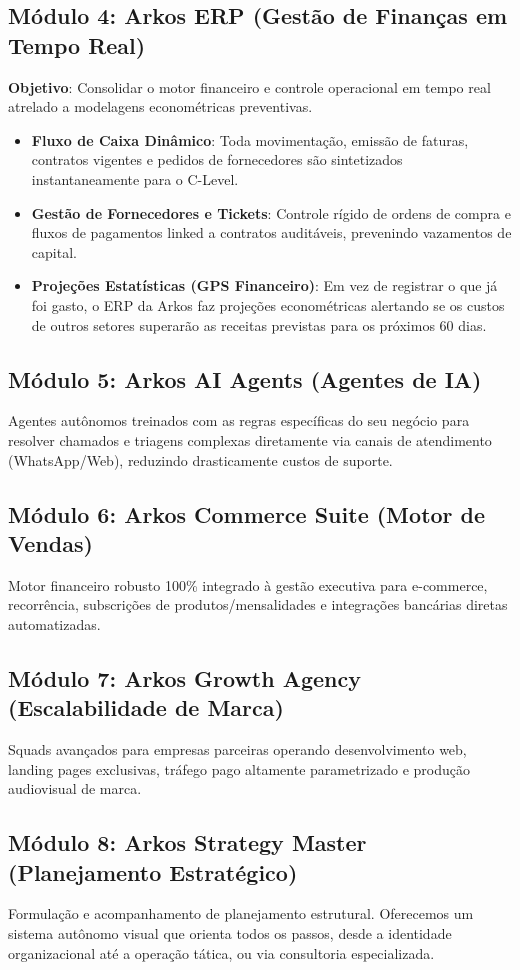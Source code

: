 \subsection{Módulo 4: Arkos ERP (Gestão de Finanças em Tempo Real)}
\textbf{Objetivo}: Consolidar o motor financeiro e controle operacional em tempo real atrelado a modelagens econométricas preventivas.
\begin{itemize}
    \item \textbf{Fluxo de Caixa Dinâmico}: Toda movimentação, emissão de faturas, contratos vigentes e pedidos de fornecedores são sintetizados instantaneamente para o C-Level.
    \item \textbf{Gestão de Fornecedores e Tickets}: Controle rígido de ordens de compra e fluxos de pagamentos linked a contratos auditáveis, prevenindo vazamentos de capital.
    \item \textbf{Projeções Estatísticas (GPS Financeiro)}: Em vez de registrar o que já foi gasto, o ERP da Arkos faz projeções econométricas alertando se os custos de outros setores superarão as receitas previstas para os próximos 60 dias.
\end{itemize}

\subsection{Módulo 5: Arkos AI Agents (Agentes de IA)}
Agentes autônomos treinados com as regras específicas do seu negócio para resolver chamados e triagens complexas diretamente via canais de atendimento (WhatsApp/Web), reduzindo drasticamente custos de suporte.

\subsection{Módulo 6: Arkos Commerce Suite (Motor de Vendas)}
Motor financeiro robusto 100\% integrado à gestão executiva para e-commerce, recorrência, subscrições de produtos/mensalidades e integrações bancárias diretas automatizadas.

\subsection{Módulo 7: Arkos Growth Agency (Escalabilidade de Marca)}
Squads avançados para empresas parceiras operando desenvolvimento web, landing pages exclusivas, tráfego pago altamente parametrizado e produção audiovisual de marca.

\subsection{Módulo 8: Arkos Strategy Master (Planejamento Estratégico)}
Formulação e acompanhamento de planejamento estrutural. Oferecemos um sistema autônomo visual que orienta todos os passos, desde a identidade organizacional até a operação tática, ou via consultoria especializada.

